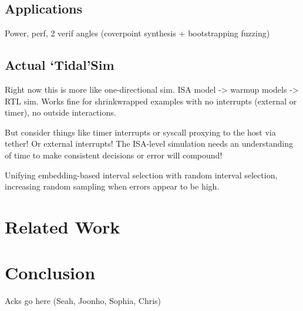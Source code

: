 \documentclass[sigplan,nonacm,10pt]{acmart}
\begin{document}
\subsection{Applications}

Power, perf, 2 verif angles (coverpoint synthesis + bootstrapping fuzzing)

\subsection{Actual `Tidal'Sim}

Right now this is more like one-directional sim. ISA model -> warmup models -> RTL sim.
Works fine for shrinkwrapped examples with no interrupts (external or timer), no outside interactions.

But consider things like timer interrupts or syscall proxying to the host via tether! Or external interrupts!
The ISA-level simulation needs an understanding of time to make consistent decisions or error will compound!

Unifying embedding-based interval selection with random interval selection, increasing random sampling when errors appear to be high.

\section{Related Work}

\section{Conclusion}


\begin{acks}
Acks go here (Seah, Joonho, Sophia, Chris)
\end{acks}




\end{document}
